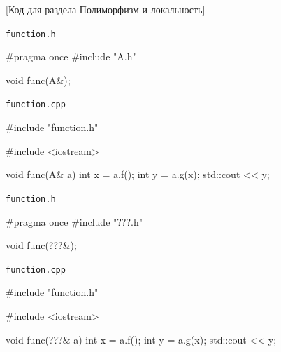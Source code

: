 [Код для раздела Полиморфизм и локальность]


\newcommand{\codewidth}{5cm}

\newsavebox\funch
\begin{lrbox}{\funch}%
\begin{minipage}[\baselineskip]{\codewidth}
\texttt{function.h}
\begin{cppcode}[numbers = none]
#pragma once
#include "A.h"


void func(A&);

\end{cppcode}
\end{minipage}%
\end{lrbox}

\newsavebox\funccpp
\begin{lrbox}{\funccpp}%
\begin{minipage}[\baselineskip]{\codewidth}
\texttt{function.cpp}
\begin{cppcode}[numbers = none]
#include "function.h"

#include <iostream>

void func(A& a) {
  int x = a.f();
  int y = a.g(x);
  std::cout << y;
}
\end{cppcode}
\end{minipage}%
\end{lrbox}

\newsavebox\funcha
\begin{lrbox}{\funcha}%
\begin{minipage}[\baselineskip]{\codewidth}
\texttt{function.h}
\begin{cppcode}[numbers = none]
#pragma once
#include "???.h"


void func(???&);

\end{cppcode}
\end{minipage}%
\end{lrbox}

\newsavebox\funccppa
\begin{lrbox}{\funccppa}%
\begin{minipage}[\baselineskip]{\codewidth}
\texttt{function.cpp}
\begin{cppcode}[numbers = none]
#include "function.h"

#include <iostream>


void func(???& a) {
  int x = a.f();
  int y = a.g(x);
  std::cout << y;
}

\end{cppcode}
\end{minipage}%
\end{lrbox}


